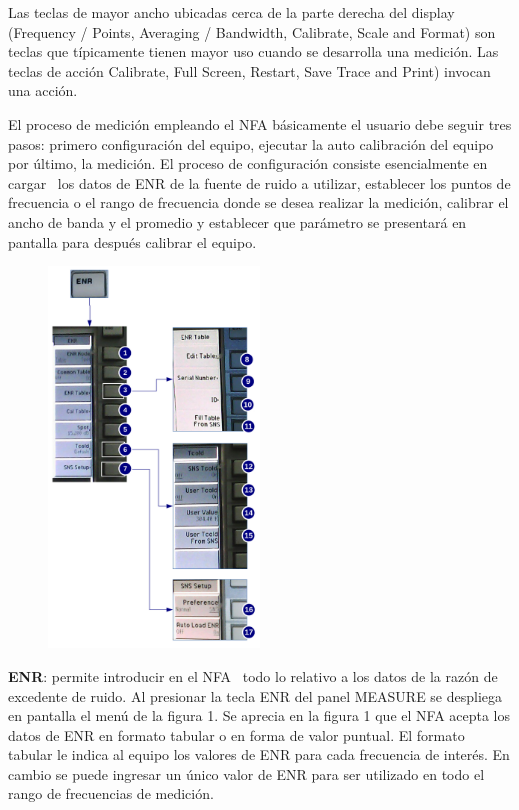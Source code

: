 {	Las teclas de mayor ancho ubicadas cerca de la parte derecha del display (Frequency / Points, Averaging / Bandwidth, Calibrate, Scale and Format) son teclas que típicamente tienen mayor uso cuando se desarrolla una medición. Las teclas de acción Calibrate, Full Screen, Restart, Save Trace and Print) invocan una acción.
			
	El proceso de medición empleando el NFA básicamente el usuario debe seguir tres pasos: primero configuración del equipo, ejecutar la auto calibración del equipo por último, la medición. El proceso de configuración consiste esencialmente en cargar \ los datos de ENR de la fuente de ruido a utilizar, establecer los puntos de frecuencia o el rango de frecuencia donde se desea realizar la medición, calibrar el ancho de banda y el promedio y establecer que parámetro se presentará en pantalla para después calibrar el equipo.
	
	\begin{minipage}[t]{\textwidth}
		\begin{figure}
			\includegraphics[width=0.5\textwidth]{./Imagenes/MenuENRN8975A.pdf}		
		\end{figure}
	
		\textbf{ENR}: permite introducir en el NFA \ todo lo relativo a los datos de la razón de excedente de ruido. Al presionar la tecla ENR del panel MEASURE se despliega en pantalla el menú de la figura 1. Se aprecia en la figura 1 que el NFA acepta los datos de ENR en formato tabular o en forma de valor
		puntual. El formato tabular le indica al equipo los valores de ENR para cada frecuencia de interés. En cambio se puede ingresar un único valor de ENR para ser utilizado en todo el rango de frecuencias de medición.	
		

\end{minipage}}
